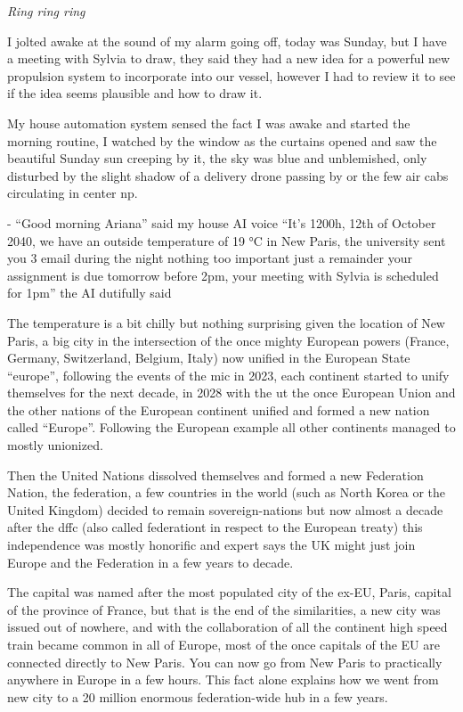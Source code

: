 \documentclass[colorlinks,12pt,a4paper]{book}
\begin{document}
\textit{Ring ring ring}\par
I jolted awake at the sound of my alarm going off, 
today was Sunday, but I have a meeting with Sylvia to draw, 
they said they had a new idea for a powerful new propulsion system to incorporate into our vessel, however 
I had to review it to see if the idea seems plausible and how to draw it.\par
\bigskip
My house automation system sensed the fact I was awake and 
started the morning routine, I watched by the window as the curtains opened and 
saw the beautiful Sunday sun creeping by it, the sky was blue and unblemished, only disturbed by the 
slight shadow of a delivery drone passing by or the few air cabs circulating in center \gls{np}.\par
\bigskip
- “Good morning Ariana” said my house AI voice\newline
“It's 1200h, 12th of October 2040, we have an outside temperature of 19 °C in New Paris, 
the university sent you 3 email during the night nothing too important just a remainder your 
assignment is due tomorrow before 2pm, your meeting with Sylvia is scheduled for 1pm” the AI dutifully said\par
\bigskip

The temperature is a bit chilly but nothing surprising given the location of New Paris,
a big city in the intersection of the once mighty European powers (France, Germany, Switzerland, Belgium, Italy) 
now unified in the European State “\gls{europe}”, following the events of the \gls{mic} in 2023, 
each continent started to unify themselves for the next decade, in 2028 with the \gls{ut} the once European Union 
and the other nations of the European continent unified and formed a new nation called “Europe”. 
Following the European example all other continents managed to mostly unionized.\par
\bigskip 

Then the United Nations dissolved themselves and formed a new Federation Nation, 
the \gls{federation}, a few countries in the world (such as North Korea or the United Kingdom) 
decided to remain sovereign-nations but now almost a decade after the \gls{dffc} (also called \gls{federationt} in respect to the European treaty) this independence was mostly honorific 
and expert says the UK might just join Europe and the Federation in a few years to decade.\par
\bigskip

The capital was named after the most populated city of the ex-EU, 
Paris, capital of the province of France, but that is the end of the similarities, 
a new city was issued out of nowhere, and with the collaboration of all the continent 
high speed train became common in all of Europe, most of the once capitals of the EU are connected directly to New Paris. 
You can now go from New Paris to practically anywhere in Europe in a few hours. 
This fact alone explains how we went from new city to a 20 million enormous federation-wide hub in a few years.\par
\bigskip
\end{document}
